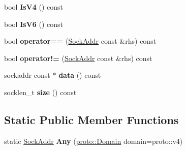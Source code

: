 \begin{DoxyCompactItemize}
\item 
\hypertarget{classlsf_1_1asio_1_1SockAddr_ab84a1f24bb07d687bf5db80385813e75}{
bool {\bfseries IsV4} () const }
\label{classlsf_1_1asio_1_1SockAddr_ab84a1f24bb07d687bf5db80385813e75}

\item 
\hypertarget{classlsf_1_1asio_1_1SockAddr_a443b74234c26c974be42093230d00ad0}{
bool {\bfseries IsV6} () const }
\label{classlsf_1_1asio_1_1SockAddr_a443b74234c26c974be42093230d00ad0}

\item 
\hypertarget{classlsf_1_1asio_1_1SockAddr_aac1c3ed4b2792f9269dfee4d82ec3683}{
bool {\bfseries operator==} (\hyperlink{classlsf_1_1asio_1_1SockAddr}{SockAddr} const \&rhs) const }
\label{classlsf_1_1asio_1_1SockAddr_aac1c3ed4b2792f9269dfee4d82ec3683}

\item 
\hypertarget{classlsf_1_1asio_1_1SockAddr_a74b6371260ed0e90af8591250875fb90}{
bool {\bfseries operator!=} (\hyperlink{classlsf_1_1asio_1_1SockAddr}{SockAddr} const \&rhs) const }
\label{classlsf_1_1asio_1_1SockAddr_a74b6371260ed0e90af8591250875fb90}

\item 
\hypertarget{classlsf_1_1asio_1_1SockAddr_a01ed07d2995b08cd4910ae50039241a6}{
sockaddr const $\ast$ {\bfseries data} () const }
\label{classlsf_1_1asio_1_1SockAddr_a01ed07d2995b08cd4910ae50039241a6}

\item 
\hypertarget{classlsf_1_1asio_1_1SockAddr_a2fc4ea284e6d55a4bebce19e487dd18b}{
socklen\_\-t {\bfseries size} () const }
\label{classlsf_1_1asio_1_1SockAddr_a2fc4ea284e6d55a4bebce19e487dd18b}

\end{DoxyCompactItemize}
\subsection*{Static Public Member Functions}
\begin{DoxyCompactItemize}
\item 
\hypertarget{classlsf_1_1asio_1_1SockAddr_a453a6d8ce67ab33f3022c704a7c3f1f9}{
static \hyperlink{classlsf_1_1asio_1_1SockAddr}{SockAddr} {\bfseries Any} (\hyperlink{classlsf_1_1asio_1_1proto_1_1Domain}{proto::Domain} domain=proto::v4)}
\label{classlsf_1_1asio_1_1SockAddr_a453a6d8ce67ab33f3022c704a7c3f1f9}

\end{DoxyCompactItemize}
